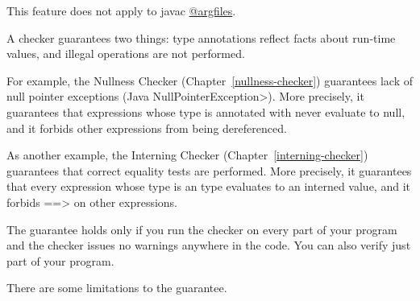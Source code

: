 This feature does not apply to javac \href{https://docs.oracle.com/javase/7/docs/technotes/tools/windows/javac.html#commandlineargfile}{@argfiles}.



A checker guarantees two things:  type annotations reflect facts about
run-time values, and illegal operations are not performed.

For example, the Nullness Checker (Chapter~\ref{nullness-checker})
guarantees lack of null pointer exceptions (Java \<NullPointerException>).
More precisely, it guarantees
that expressions whose type is annotated with
 never evaluate to null,
and it forbids other expressions from being dereferenced.

As another example, the Interning Checker (Chapter~\ref{interning-checker})
guarantees that correct equality tests are performed.
More precisely, it guarantees that
every expression whose type is an  type
evaluates to an interned value, and it forbids
\<==>  on other expressions.

The guarantee holds only if you run the checker on every part of your
program and the checker issues no warnings anywhere in the code.
You can also verify just part of your program.

There are some limitations to the guarantee.



